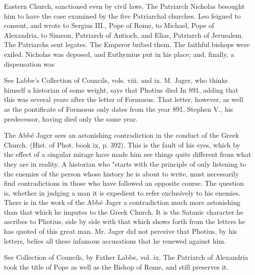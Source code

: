 Eastern Church, sanctioned even by civil laws. The Patriarch Nicholas besought him to have the case examined by the five Patriarchal churches. Leo feigned to consent, and wrote to Sergius III., Pope of Rome, to Michael, Pope of Alexandria, to Simeon, Patriarch of Antioch, and Elias, Patriarch of Jerusalem. The Patriarchs sent legates. The Emperor bribed them. The faithful bishops were exiled. Nicholas was deposed, and Euthymius put in his place; and, finally, a dispensation was

See Labbe’s Collection of Councils, vols. viii. and ix. M. Jager, who thinks himself a historian of some weight, says that Photius died In 891, adding that this was several years after the letter of Formosus. That letter, however, as well as the pontificate of Formosus only dates from the year 891, Stephen V., his predecessor, having died only the same year.

The Abbé Jager sees an astonishing contradiction in the conduct of the Greek Church. (Hist. of Phot. book ix, p. 392). This is the fault of his eyes, which by the effect of a singular mirage have made him see things quite different from what they are in reality. A historian who "starts with the principle of only listening to the enemies of the person whose history he is about to write, must necessarily find contradictions in those who have followed an opposite course. The question is, whether in judging a man it is expedient to refer exclusively to his enemies. There is in the work of the Abbé Jager a contradiction much more astonishing than that which he imputes to the Greek Church. It is the Satanic character he ascribes to Photius, side by side with that which shows forth from the letters he has quoted of this great man. Mr. Jager did not perceive that Photius, by his letters, belies all these infamous accusations that he renewed against him.

See Collection of Councils, by Father Labbe, vol. ix. The Patriarch of Alexandria took the title of Pope as well as the Bishop of Rome, and still preserves it.

